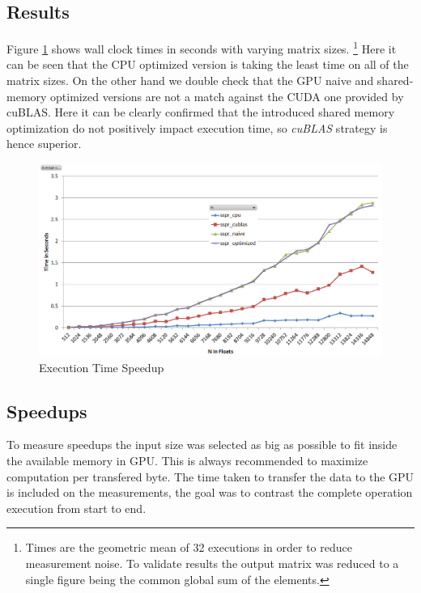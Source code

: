 \documentclass{llncs}
\begin{document}
\subsection{Results}

Figure \ref{fig:speedup} shows wall clock times in seconds with varying matrix sizes.
\footnote{Times are the geometric mean of 32 executions in order to reduce measurement noise.
To validate results the output matrix was reduced to a single figure being the common global sum of the elements.}
Here it can be seen that the CPU optimized version is taking the least time on all of the matrix sizes.
On the other hand we double check that the GPU naive and shared-memory optimized versions are not a match against the CUDA one provided by cuBLAS. Here it can be clearly confirmed that the introduced shared memory optimization do not positively impact execution time, so {\it cuBLAS} strategy is hence superior. 

\begin{figure}[H]
\begin{center}
\includegraphics[scale=0.4]{speedup.png}
\caption{Execution Time Speedup}
\label{fig:speedup}
\end{center}
\end{figure}

\subsection{Speedups}

To measure speedups the input size was selected as big as possible to fit inside the available memory in GPU. This is always recommended to maximize computation per transfered byte. The time taken to transfer the data to the GPU is included on the measurements, the goal was to contrast the complete operation execution from start to end.
\end{document}
